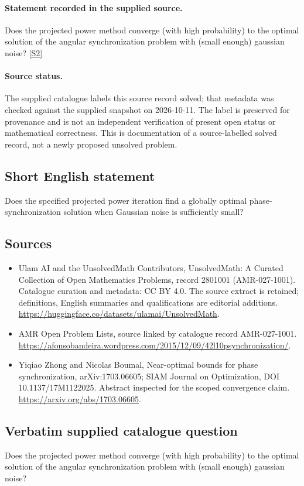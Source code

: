 \documentclass[11pt]{article}
\begin{document}
\paragraph{Statement recorded in the supplied source.}
Does the projected power method converge (with high probability) to the optimal solution of the angular synchronization problem with (small enough) gaussian noise? \href{https://afonsobandeira.wordpress.com/2015/12/09/42l10psynchronization/}{[S2]}
\paragraph{Source status.}
The supplied catalogue labels this source record solved; that metadata was checked against the supplied snapshot on 2026-10-11. The label is preserved for provenance and is not an independent verification of present open status or mathematical correctness. This is documentation of a source-labelled solved record, not a newly proposed unsolved problem.
\subsection{Short English statement}
Does the specified projected power iteration find a globally optimal phase-synchronization solution when Gaussian noise is sufficiently small?
\subsection{Sources}
\begin{itemize}
\item[S1] Ulam AI and the UnsolvedMath Contributors, UnsolvedMath: A Curated Collection of Open Mathematics Problems, record 2801001 (AMR-027-1001). Catalogue curation and metadata: CC BY 4.0. The source extract is retained; definitions, English summaries and qualifications are editorial additions.
\url{https://huggingface.co/datasets/ulamai/UnsolvedMath}.
\item[S2] AMR Open Problem Lists, source linked by catalogue record AMR-027-1001.
\url{https://afonsobandeira.wordpress.com/2015/12/09/42l10psynchronization/}.
\item[S3] Yiqiao Zhong and Nicolas Boumal, Near-optimal bounds for phase synchronization, arXiv:1703.06605; SIAM Journal on Optimization, DOI 10.1137/17M1122025. Abstract inspected for the scoped convergence claim.
\url{https://arxiv.org/abs/1703.06605}.
\end{itemize}
\subsection{Verbatim supplied catalogue question}
Does the projected power method converge (with high probability) to the optimal solution of the angular synchronization problem with (small enough) gaussian noise?
\end{document}
